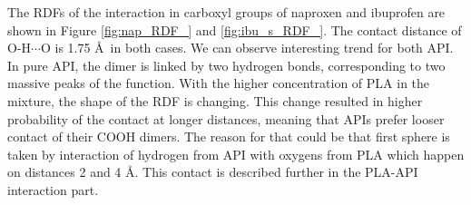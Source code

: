 The RDFs of the interaction in carboxyl groups of naproxen and ibuprofen are shown in Figure \ref{fig:nap_RDF_} and \ref{fig:ibu_s_RDF_}. The contact distance of O-H$\cdots$O is 1.75 \AA~in both cases. We can observe interesting trend for both API. In pure API, the dimer is linked by two hydrogen bonds, corresponding to two massive peaks of the function. With the higher concentration of PLA in the mixture, the shape of the RDF is changing. This change resulted in higher probability of the contact at longer distances, meaning that APIs prefer looser contact of their COOH dimers. The reason for that could be that first sphere is taken by interaction of hydrogen from API with oxygens from PLA which happen on distances 2 and 4 \AA. This contact is described further in the PLA-API interaction part. 


\newpage
\begin{figure}[H]
	\centering
	\\

\end{figure}
